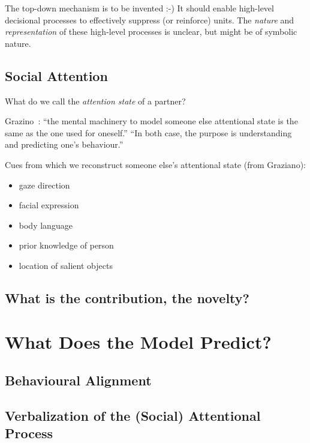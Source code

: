 \documentclass[a4paper]{article}
\begin{document}
The top-down mechanism is to be invented :-)
It should enable high-level decisional processes to effectively suppress (or
reinforce) units. The \emph{nature} and \emph{representation} of these
high-level processes is unclear, but might be of symbolic nature.



\subsection{Social Attention}

What do we call the \emph{attention state} of a partner?


Grazino~\cite{graziano2013consciousness}: ``the mental machinery to model
someone else attentional state is the same as the one used for oneself.''
``In both case, the purpose is understanding and predicting one's behaviour.''

Cues from which we reconstruct someone else's attentional state (from Graziano):
\begin{itemize}
    \item gaze direction
    \item facial expression
    \item body language
    \item prior knowledge of person
    \item location of salient objects
\end{itemize}

\subsection{What is the contribution, the novelty?}



\section{What Does the Model Predict?}

\subsection{Behavioural Alignment}
\subsection{Verbalization of the (Social) Attentional Process}
\end{document}
